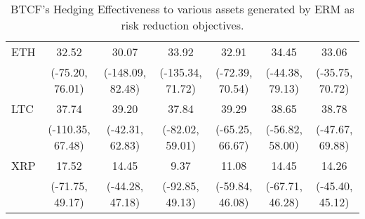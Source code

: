\begin{table}[H]
{\begin{tabular}{lcccccc}
ETH     &             32.52 &              30.07 &             33.92 &             32.91 &             34.45 &             33.06 \\
        &   (-75.20, 76.01) &   (-148.09, 82.48) &  (-135.34, 71.72) &   (-72.39, 70.54) &   (-44.38, 79.13) &   (-35.75, 70.72) \\
LTC     &             37.74 &              39.20 &             37.84 &             39.29 &             38.65 &             38.78 \\
        &  (-110.35, 67.48) &    (-42.31, 62.83) &   (-82.02, 59.01) &   (-65.25, 66.67) &   (-56.82, 58.00) &   (-47.67, 69.88) \\
XRP     &             17.52 &              14.45 &              9.37 &             11.08 &             14.45 &             14.26 \\
        &   (-71.75, 49.17) &    (-44.28, 47.18) &   (-92.85, 49.13) &   (-59.84, 46.08) &   (-67.71, 46.28) &   (-45.40, 45.12) \\
\bottomrule
\end{tabular}}
\caption{BTCF's Hedging Effectiveness to various assets generated by ERM as risk reduction objectives.}
\label{tab:ERMHE}
\end{table}